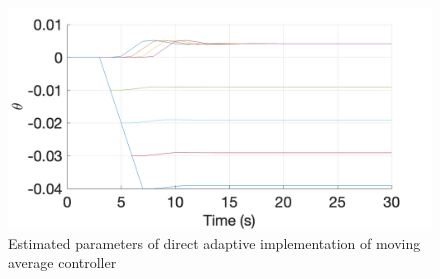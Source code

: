 \begin{figure}
	\centering
	\includegraphics[width=\textwidth]{images/sstr73.png}
	\caption{Estimated parameters of direct adaptive implementation of moving average controller}
	\label{fig:sstr73}
\end{figure}



